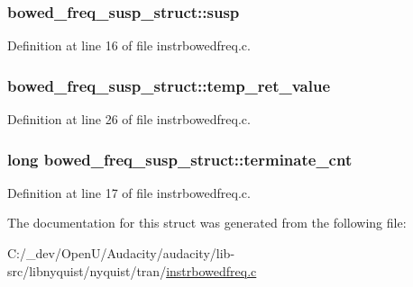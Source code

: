 \subsubsection[{\texorpdfstring{susp}{susp}}]{ bowed\+\_\+freq\+\_\+susp\+\_\+struct\+::susp}\hypertarget{structbowed__freq__susp__struct_ad584afca9b20bd051209b57122bcb279}{}\label{structbowed__freq__susp__struct_ad584afca9b20bd051209b57122bcb279}


Definition at line 16 of file instrbowedfreq.\+c.

\subsubsection[{\texorpdfstring{temp\+\_\+ret\+\_\+value}{temp_ret_value}}]{ bowed\+\_\+freq\+\_\+susp\+\_\+struct\+::temp\+\_\+ret\+\_\+value}\hypertarget{structbowed__freq__susp__struct_ab58885f55727eac7b89a1487b6834884}{}\label{structbowed__freq__susp__struct_ab58885f55727eac7b89a1487b6834884}


Definition at line 26 of file instrbowedfreq.\+c.

\subsubsection[{\texorpdfstring{terminate\+\_\+cnt}{terminate_cnt}}]{\setlength{\rightskip}{0pt plus 5cm}long bowed\+\_\+freq\+\_\+susp\+\_\+struct\+::terminate\+\_\+cnt}\hypertarget{structbowed__freq__susp__struct_a26106dc8432360a941392e386fe79063}{}\label{structbowed__freq__susp__struct_a26106dc8432360a941392e386fe79063}


Definition at line 17 of file instrbowedfreq.\+c.



The documentation for this struct was generated from the following file\+:\begin{DoxyCompactItemize}
\item 
C\+:/\+\_\+dev/\+Open\+U/\+Audacity/audacity/lib-\/src/libnyquist/nyquist/tran/\hyperlink{instrbowedfreq_8c}{instrbowedfreq.\+c}\end{DoxyCompactItemize}

